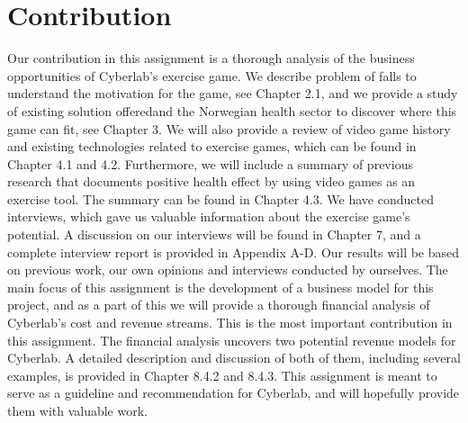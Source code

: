\section{Contribution}
Our contribution in this assignment is a thorough analysis of the business opportunities of Cyberlab’s exercise game. We describe problem of falls to understand the motivation for the game, see Chapter 2.1, and we provide a study of existing solution offeredand the Norwegian health sector to discover where this game can fit, see Chapter 3. We will also provide a review of video game history and existing technologies related to exercise games, which can be found in Chapter 4.1 and 4.2. Furthermore, we will include a summary of previous research that documents positive health effect by using video games as an exercise tool. The summary can be found in Chapter 4.3. We have conducted interviews, which gave us valuable information about the exercise game’s potential. A discussion on our interviews will be found in Chapter 7, and a complete interview report is provided in Appendix A-D. Our results will be based on previous work, our own opinions and interviews conducted by ourselves. The main focus of this assignment is the development of a business model for this project, and as a part of this we will provide a thorough financial analysis of Cyberlab’s cost and revenue streams. This is the most important contribution in this assignment. The financial analysis uncovers two potential revenue models for Cyberlab. A detailed description and discussion of both of them, including several examples, is provided in Chapter 8.4.2 and 8.4.3. This assignment is meant to serve as a guideline and recommendation for Cyberlab, and will hopefully provide them with valuable work.

